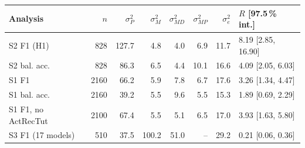 \begin{tabular}{@{}lrrrrrrl@{}}
\toprule
Analysis & $n$ & $\sigma^2_P$ & $\sigma^2_M$ & $\sigma^2_{MD}$ & $\sigma^2_{MP}$ & $\sigma^2_e$ & $R$ [97.5\,\% int.] \\
\midrule
S2 F1 (H1) & 828 & 127.7 & 4.8 & 4.0 & 6.9 & 11.7 & 8.19 [2.85, 16.90] \\
S2 bal. acc. & 828 & 86.3 & 6.5 & 4.4 & 10.1 & 16.6 & 4.09 [2.05, 6.03] \\
S1 F1 & 2160 & 66.2 & 5.9 & 7.8 & 6.7 & 17.6 & 3.26 [1.34, 4.47] \\
S1 bal. acc. & 2160 & 39.2 & 5.5 & 9.6 & 5.5 & 15.3 & 1.89 [0.69, 2.29] \\
S1 F1, no ActRecTut & 2100 & 67.4 & 5.5 & 5.1 & 6.5 & 17.0 & 3.93 [1.63, 5.80] \\
S3 F1 (17 models) & 510 & 37.5 & 100.2 & 51.0 & -- & 29.2 & 0.21 [0.06, 0.36] \\
\bottomrule
\end{tabular}
